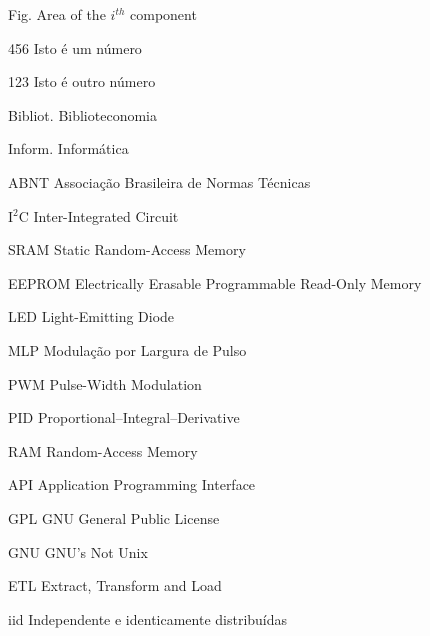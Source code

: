 \begin{siglas}
	\item[Fig.] Area of the $i^{th}$ component
	\item[456] Isto é um número
	\item[123] Isto é outro número
	\item [Bibliot.] Biblioteconomia
	\item [Inform.]  Informática
	\item [ABNT] Associação Brasileira de Normas Técnicas
	\item [I$^2$C] Inter-Integrated Circuit
	\item [SRAM] Static Random-Access Memory
	\item [EEPROM]  Electrically Erasable Programmable Read-Only Memory
	\item [LED] Light-Emitting Diode
	\item [MLP] Modulação por Largura de Pulso
	\item [PWM] Pulse-Width Modulation
	\item [PID] Proportional–Integral–Derivative
	\item [RAM] Random-Access Memory
	\item [API] Application Programming Interface
	\item [GPL] GNU General Public License
	\item [GNU] GNU's Not Unix
	\item [ETL] Extract, Transform and Load
	\item [iid] Independente e identicamente distribuídas
\end{siglas}